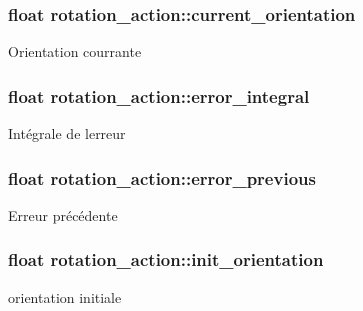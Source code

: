 \subsubsection[{\texorpdfstring{current\+\_\+orientation}{current_orientation}}]{\setlength{\rightskip}{0pt plus 5cm}float rotation\+\_\+action\+::current\+\_\+orientation\hspace{0.3cm}{\ttfamily [private]}}\hypertarget{classrotation__action_a6fe4eb8e6d6bfbdb424c7d230567cb05}{}\label{classrotation__action_a6fe4eb8e6d6bfbdb424c7d230567cb05}
Orientation courrante 
\subsubsection[{\texorpdfstring{error\+\_\+integral}{error_integral}}]{\setlength{\rightskip}{0pt plus 5cm}float rotation\+\_\+action\+::error\+\_\+integral\hspace{0.3cm}{\ttfamily [private]}}\hypertarget{classrotation__action_a058362ccfef2bc879166a0b1c2d1fe07}{}\label{classrotation__action_a058362ccfef2bc879166a0b1c2d1fe07}
Intégrale de l\textquotesingle{}erreur 
\subsubsection[{\texorpdfstring{error\+\_\+previous}{error_previous}}]{\setlength{\rightskip}{0pt plus 5cm}float rotation\+\_\+action\+::error\+\_\+previous\hspace{0.3cm}{\ttfamily [private]}}\hypertarget{classrotation__action_aadce9a6acc78dc94cabadf60f6205977}{}\label{classrotation__action_aadce9a6acc78dc94cabadf60f6205977}
Erreur précédente 
\subsubsection[{\texorpdfstring{init\+\_\+orientation}{init_orientation}}]{\setlength{\rightskip}{0pt plus 5cm}float rotation\+\_\+action\+::init\+\_\+orientation\hspace{0.3cm}{\ttfamily [private]}}\hypertarget{classrotation__action_a6e3e3cac7a7f2365d030ad704e04c5a6}{}\label{classrotation__action_a6e3e3cac7a7f2365d030ad704e04c5a6}
orientation initiale 

